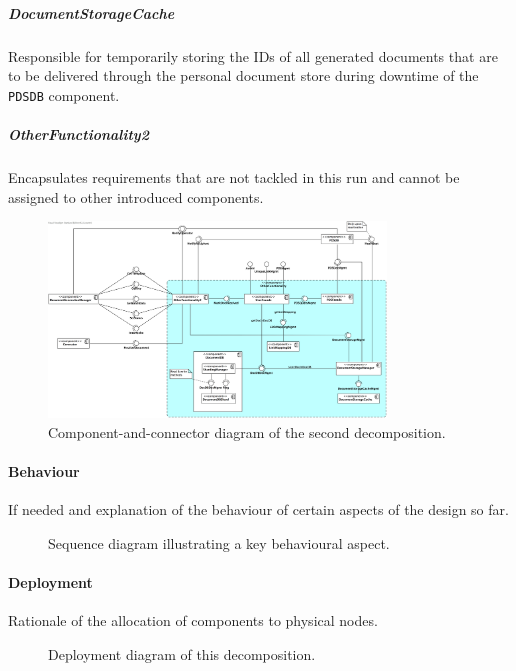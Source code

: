 \documentclass[a4paper,10pt]{article}
\begin{document}
\subparagraph{DocumentStorageCache}
Responsible for temporarily storing the IDs of all generated documents that are to be delivered through the personal document store during downtime of the \texttt{PDSDB} component.

\subparagraph{OtherFunctionality2}
Encapsulates requirements that are not tackled in this run and cannot be assigned to other introduced components.

\begin{figure}[!htp]
	\centering
	\includegraphics[width=0.8\textwidth]{OtherFunctionality.png}
	\caption{Component-and-connector diagram of the second decomposition.}
	\label{fig:decomp2}
\end{figure}

\paragraph{Behaviour}
If needed and explanation of the behaviour of certain aspects of the design so
far.

\begin{figure}[!htp]
    \centering
    \caption{Sequence diagram illustrating a key behavioural aspect.
        }\label{fig:it1-seq_aspect1}
\end{figure}

\paragraph{Deployment}
Rationale of the allocation of components to physical nodes.

\begin{figure}[!htp]
    \centering
    \caption{Deployment diagram of this decomposition.
        }\label{fig:it1-depl_main}
\end{figure}
\end{document}
